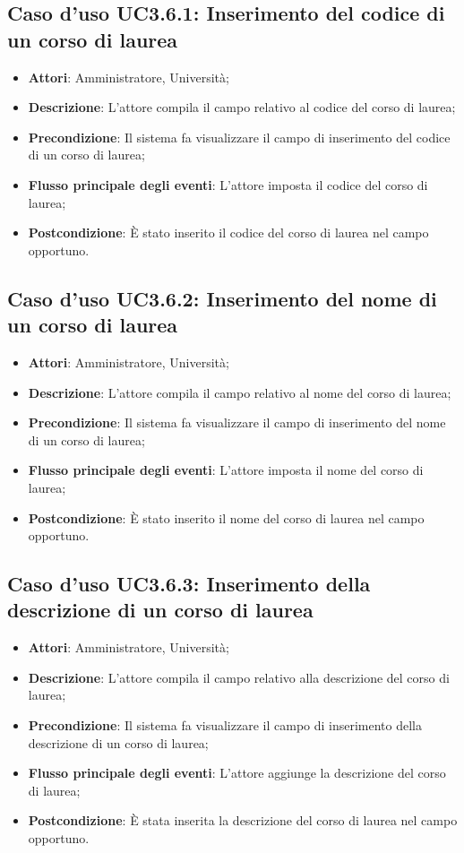 \subsection{Caso d'uso \texorpdfstring{UC3.6.1}{UC3.6.1}: Inserimento del codice di un corso di laurea}
\begin{itemize}
	\item \textbf{Attori}: Amministratore, Università;
	\item \textbf{Descrizione}: L'attore compila il campo relativo al codice del corso di laurea;
	\item \textbf{Precondizione}: Il sistema fa visualizzare il campo di inserimento del codice di un corso di laurea;
	\item \textbf{Flusso principale degli eventi}: L'attore imposta il codice del corso di laurea;
	\item \textbf{Postcondizione}: È stato inserito il codice del corso di laurea nel campo opportuno.
\end{itemize}
\subsection{Caso d'uso \texorpdfstring{UC3.6.2}{UC3.6.2}: Inserimento del nome di un corso di laurea}
\begin{itemize}
	\item \textbf{Attori}: Amministratore, Università;
	\item \textbf{Descrizione}: L'attore compila il campo relativo al nome del corso di laurea;
	\item \textbf{Precondizione}: Il sistema fa visualizzare il campo di inserimento del nome di un corso di laurea;
	\item \textbf{Flusso principale degli eventi}: L'attore imposta il nome del corso di laurea;
	\item \textbf{Postcondizione}: È stato inserito il nome del corso di laurea nel campo opportuno.
\end{itemize}
\subsection{Caso d'uso \texorpdfstring{UC3.6.3}{UC3.6.3}: Inserimento della descrizione di un corso di laurea}
\begin{itemize}
	\item \textbf{Attori}: Amministratore, Università;
	\item \textbf{Descrizione}: L'attore compila il campo relativo alla descrizione del corso di laurea;
	\item \textbf{Precondizione}: Il sistema fa visualizzare il campo di inserimento della descrizione di un corso di laurea;
	
	\item \textbf{Flusso principale degli eventi}: L'attore aggiunge la descrizione del corso di laurea;
	\item \textbf{Postcondizione}: È stata inserita la descrizione del corso di laurea nel campo opportuno.
\end{itemize}
